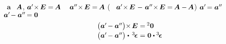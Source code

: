 ~$\bm{a}$
~${\hspace{-0.2ex}\bm{A}}$,
${ \bm{a}' \hspace{-0.4ex} \times \hspace{-0.2ex} \bm{E} = \hspace{-0.2ex} \bm{A} }$
~%
${ \bm{a}'\hspace{-0.15ex}' \hspace{-0.4ex} \times \hspace{-0.2ex} \bm{E} = \hspace{-0.2ex} \bm{A} }$
(~%
${ \bm{a}' \hspace{-0.4ex} \times \hspace{-0.2ex} \bm{E}
\hspace{.2ex} - \hspace{.2ex} \bm{a}'\hspace{-0.15ex}' \hspace{-0.4ex} \times \hspace{-0.2ex} \bm{E}
= \hspace{-0.2ex} \bm{A} - \hspace{-0.2ex} \bm{A} }$)\ru{,}
${ \bm{a}' \hspace{-0.3ex} = \bm{a}'\hspace{-0.15ex}' \hspace{-0.2ex} }$
${ \bm{a}' \hspace{-0.3ex} - \bm{a}'\hspace{-0.15ex}' \hspace{-0.2ex} = {\bm{0}} }$
%
\begin{equation*}
\begin{array}{r@{\hspace{0ex}}c@{\hspace{.3ex}}r@{\hspace{.7ex}}c@{\hspace{.7ex}}l@{\hspace{0ex}}c@{\hspace{.3ex}}l}
\bigl( \bm{a}' \hspace{-0.2ex} - \bm{a}'\hspace{-0.15ex}' \bigr) & \times & \bm{E}
& = &
\hspace{-0.2ex} \zerobivalent
\\[.2em]
\bigl( \bm{a}' \hspace{-0.2ex} - \bm{a}'\hspace{-0.15ex}' \bigr) & \dotp & \hspace{-0.4ex} \permutationsparitytensor
& = &
\zerovector \dotp \permutationsparitytensor
\end{array}
\end{equation*}

